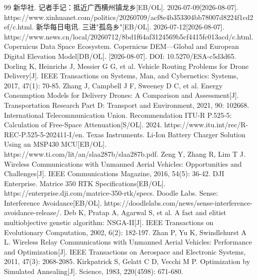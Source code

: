 \documentclass[bwprint]{gmcmthesis}
\begin{document}
\pagestyle{plain}

\newpage
\tableofcontents
\clearpage













\begin{thebibliography}{99}
 新华社. 记者手记：抵近广西横州镇龙乡[EB/OL]. 2026-07-09[2026-08-07]. https://www.xinhuanet.com/politics/20260709/acf8e4b353304bb78007d8224f1cd2ef/c.html.
 新华每日电讯. 三进"孤岛乡"[EB/OL]. 2026-07-12[2026-08-07]. https://www.news.cn/local/20260712/8bd1f64af3124569b5cf4415fc013acd/c.html.
 Copernicus Data Space Ecosystem. Copernicus DEM—Global and European Digital Elevation Model[DB/OL]. [2026-08-07]. DOI: 10.5270/ESA-c5d3d65.
 Dorling K, Heinrichs J, Messier G G, et al. Vehicle Routing Problems for Drone Delivery[J]. IEEE Transactions on Systems, Man, and Cybernetics: Systems, 2017, 47(1): 70-85.
 Zhang J, Campbell J F, Sweeney D C, et al. Energy Consumption Models for Delivery Drones: A Comparison and Assessment[J]. Transportation Research Part D: Transport and Environment, 2021, 90: 102668.
 International Telecommunication Union. Recommendation ITU-R P.525-5: Calculation of Free-Space Attenuation[S/OL]. 2024. https://www.itu.int/rec/R-REC-P.525-5-202411-I/en.
 Texas Instruments. Li-Ion Battery Charger Solution Using an MSP430 MCU[EB/OL]. https://www.ti.com/lit/an/slaa287b/slaa287b.pdf.
 Zeng Y, Zhang R, Lim T J. Wireless Communications with Unmanned Aerial Vehicles: Opportunities and Challenges[J]. IEEE Communications Magazine, 2016, 54(5): 36-42.
 DJI Enterprise. Matrice 350 RTK Specifications[EB/OL]. https://enterprise.dji.com/matrice-350-rtk/specs.
 Doodle Labs. Sense: Interference Avoidance[EB/OL]. https://doodlelabs.com/news/sense-interference-avoidance-release/.
 Deb K, Pratap A, Agarwal S, et al. A fast and elitist multiobjective genetic algorithm: NSGA-II[J]. IEEE Transactions on Evolutionary Computation, 2002, 6(2): 182-197.
 Zhan P, Yu K, Swindlehurst A L. Wireless Relay Communications with Unmanned Aerial Vehicles: Performance and Optimization[J]. IEEE Transactions on Aerospace and Electronic Systems, 2011, 47(3): 2068-2085.
 Kirkpatrick S, Gelatt C D, Vecchi M P. Optimization by Simulated Annealing[J]. Science, 1983, 220(4598): 671-680.
\end{thebibliography}

\begin{appendices}


\end{appendices}
\end{document}
